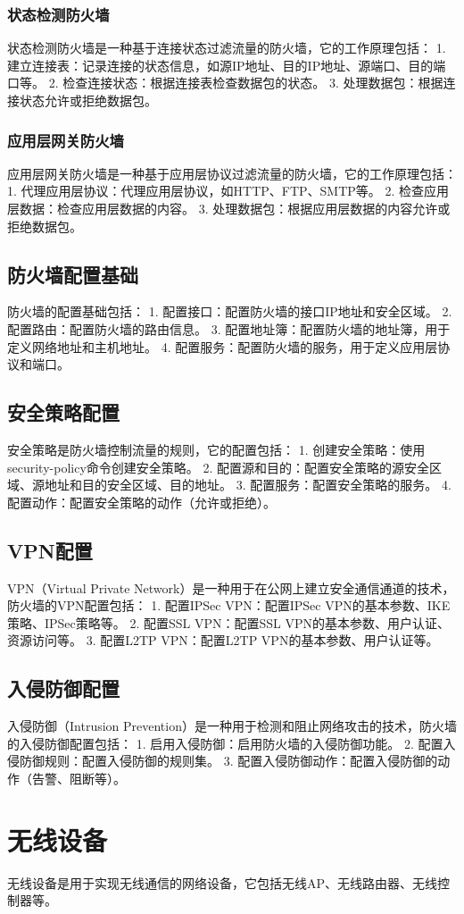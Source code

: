 \documentclass{book}
\begin{document}
\subsubsection{状态检测防火墙}
状态检测防火墙是一种基于连接状态过滤流量的防火墙，它的工作原理包括：
1. 建立连接表：记录连接的状态信息，如源IP地址、目的IP地址、源端口、目的端口等。
2. 检查连接状态：根据连接表检查数据包的状态。
3. 处理数据包：根据连接状态允许或拒绝数据包。
\subsubsection{应用层网关防火墙}
应用层网关防火墙是一种基于应用层协议过滤流量的防火墙，它的工作原理包括：
1. 代理应用层协议：代理应用层协议，如HTTP、FTP、SMTP等。
2. 检查应用层数据：检查应用层数据的内容。
3. 处理数据包：根据应用层数据的内容允许或拒绝数据包。
\subsection{防火墙配置基础}
防火墙的配置基础包括：
1. 配置接口：配置防火墙的接口IP地址和安全区域。
2. 配置路由：配置防火墙的路由信息。
3. 配置地址簿：配置防火墙的地址簿，用于定义网络地址和主机地址。
4. 配置服务：配置防火墙的服务，用于定义应用层协议和端口。
\subsection{安全策略配置}
安全策略是防火墙控制流量的规则，它的配置包括：
1. 创建安全策略：使用security-policy命令创建安全策略。
2. 配置源和目的：配置安全策略的源安全区域、源地址和目的安全区域、目的地址。
3. 配置服务：配置安全策略的服务。
4. 配置动作：配置安全策略的动作（允许或拒绝）。
\subsection{VPN配置}
VPN（Virtual Private Network）是一种用于在公网上建立安全通信通道的技术，防火墙的VPN配置包括：
1. 配置IPSec VPN：配置IPSec VPN的基本参数、IKE策略、IPSec策略等。
2. 配置SSL VPN：配置SSL VPN的基本参数、用户认证、资源访问等。
3. 配置L2TP VPN：配置L2TP VPN的基本参数、用户认证等。
\subsection{入侵防御配置}
入侵防御（Intrusion Prevention）是一种用于检测和阻止网络攻击的技术，防火墙的入侵防御配置包括：
1. 启用入侵防御：启用防火墙的入侵防御功能。
2. 配置入侵防御规则：配置入侵防御的规则集。
3. 配置入侵防御动作：配置入侵防御的动作（告警、阻断等）。
\section{无线设备}
无线设备是用于实现无线通信的网络设备，它包括无线AP、无线路由器、无线控制器等。
\end{document}
